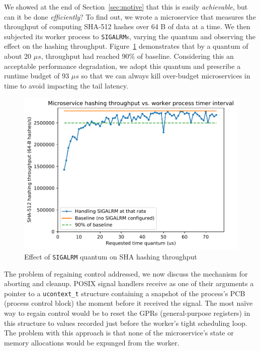 We showed at the end of Section~\ref{sec:motive} that this is easily
\textit{achievable}, but can it be done \textit{efficiently}?  To find out, we wrote
a microservice that measures the throughput of computing SHA-512 hashes over 64 B of
data at a time.  We then subjected its worker process to \texttt{SIGALRM}s, varying
the quantum and observing the effect on the hashing throughput.
Figure~\ref{fig:hashtput} demonstrates that by a quantum of about 20 $\mu{}s$,
throughput had reached 90\% of baseline.  Considering this an acceptable performance
degradation, we adopt this quantum and prescribe a runtime budget of 93 $\mu{}s$ so
that we can always kill over-budget microservices in time to avoid impacting the tail
latency.

\begin{figure}
\includegraphics[width=\columnwidth]{figs/2018-02-02-evaluation_quantum-hasher_throughput-throughput}
\caption{Effect of \texttt{SIGALRM} quantum on SHA hashing throughput}
\label{fig:hashtput}
\end{figure}

The problem of regaining control addressed, we now discuss the mechanism for aborting
and cleanup.  POSIX signal handlers receive as one of their arguments a pointer to a
\texttt{ucontext\_t} structure containing a snapshot of the process's PCB (process
control block) the moment before it received the signal.  The most na\"ive way to
regain control would be to reset the GPRs (general-purpose registers) in this
structure to values recorded just before the worker's tight scheduling loop.  The
problem with this approach is that none of the microservice's state or memory
allocations would be expunged from the worker.

